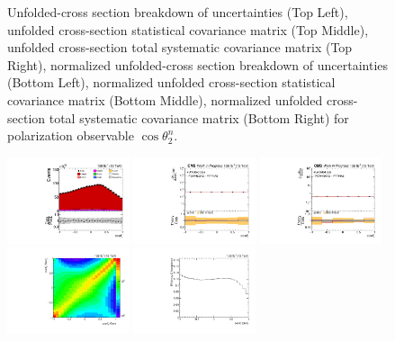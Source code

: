 \begin{figure}[htb]
\begin{center}
\caption{Unfolded-cross section breakdown of uncertainties (Top Left), unfolded cross-section statistical covariance matrix (Top Middle), unfolded cross-section total systematic covariance matrix (Top Right), normalized unfolded-cross section breakdown of uncertainties (Bottom Left), normalized unfolded cross-section statistical covariance matrix (Bottom Middle), normalized unfolded cross-section total systematic covariance matrix (Bottom Right) for polarization observable $\cos\theta_{2}^{n}$.}
\label{fig:b2n_uncertainties}
\end{center}
\end{figure}
\clearpage
\begin{figure}[htb]
\begin{center}
 \includegraphics[width=0.32\textwidth]{fig_fullRun2UL/controlplots/combined/Hyp_AntiLeptonBr.pdf}
 \includegraphics[width=0.32\textwidth]{fig_fullRun2UL/unfolding/combined/UnfoldedResults_b1r.pdf}
 \includegraphics[width=0.32\textwidth]{fig_fullRun2UL/unfolding/combined/UnfoldedResultsNorm_b1r.pdf} \\
 \includegraphics[width=0.32\textwidth]{fig_fullRun2UL/unfolding/combined/ResponseMatrix_b1r.pdf}
 \includegraphics[width=0.32\textwidth]{fig_fullRun2UL/unfolding/combined/TotEff_b1r.pdf}

\end{center}
\end{figure}
